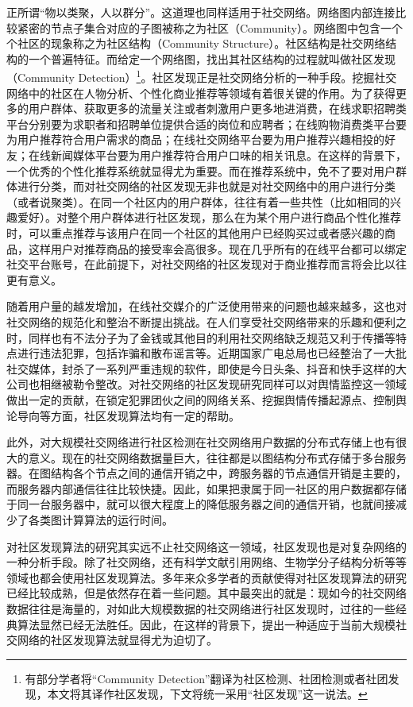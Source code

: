 正所谓“物以类聚，人以群分”。这道理也同样适用于社交网络。网络图内部连接比较紧密的节点子集合对应的子图被称之为社区（Community）。网络图中包含一个个社区的现象称之为社区结构（Community Structure）。社区结构是社交网络结构的一个普遍特征。而给定一个网络图，找出其社区结构的过程就叫做社区发现（Community Detection）\footnote{有部分学者将“Community Detection”翻译为社区检测、社团检测或者社团发现，本文将其译作社区发现，下文将统一采用“社区发现”这一说法。}。社区发现正是社交网络分析的一种手段。挖掘社交网络中的社区在人物分析、个性化商业推荐等领域有着很关键的作用。为了获得更多的用户群体、获取更多的流量关注或者刺激用户更多地进消费，在线求职招聘类平台分别要为求职者和招聘单位提供合适的岗位和应聘者；在线购物消费类平台要为用户推荐符合用户需求的商品；在线社交网络平台要为用户推荐兴趣相投的好友；在线新闻媒体平台要为用户推荐符合用户口味的相关讯息。在这样的背景下，一个优秀的个性化推荐系统就显得尤为重要。而在推荐系统中，免不了要对用户群体进行分类，而对社交网络的社区发现无非也就是对社交网络中的用户进行分类（或者说聚类）。在同一个社区内的用户群体，往往有着一些共性（比如相同的兴趣爱好）。对整个用户群体进行社区发现，那么在为某个用户进行商品个性化推荐时，可以重点推荐与该用户在同一个社区的其他用户已经购买过或者感兴趣的商品，这样用户对推荐商品的接受率会高很多。现在几乎所有的在线平台都可以绑定社交平台账号，在此前提下，对社交网络的社区发现对于商业推荐而言将会比以往更有意义。

随着用户量的越发增加，在线社交媒介的广泛使用带来的问题也越来越多，这也对社交网络的规范化和整治不断提出挑战。在人们享受社交网络带来的乐趣和便利之时，同样也有不法分子为了金钱或其他目的利用社交网络缺乏规范又利于传播等特点进行违法犯罪，包括诈骗和散布谣言等。近期国家广电总局也已经整治了一大批社交媒体，封杀了一系列严重违规的软件，即使是今日头条、抖音和快手这样的大公司也相继被勒令整改。对社交网络的社区发现研究同样可以对舆情监控这一领域做出一定的贡献，在锁定犯罪团伙之间的网络关系、挖掘舆情传播起源点、控制舆论导向等方面，社区发现算法均有一定的帮助。

此外，对大规模社交网络进行社区检测在社交网络用户数据的分布式存储上也有很大的意义。现在的社交网络数据量巨大，往往都是以图结构分布式存储于多台服务器。在图结构各个节点之间的通信开销之中，跨服务器的节点通信开销是主要的，而服务器内部通信往往比较快捷。因此，如果把隶属于同一社区的用户数据都存储于同一台服务器中，就可以很大程度上的降低服务器之间的通信开销，也就间接减少了各类图计算算法的运行时间。

对社区发现算法的研究其实远不止社交网络这一领域，社区发现也是对复杂网络的一种分析手段。除了社交网络，还有科学文献引用网络、生物学分子结构分析等等领域也都会使用社区发现算法。多年来众多学者的贡献使得对社区发现算法的研究已经比较成熟，但是依然存在着一些问题。其中最突出的就是：现如今的社交网络数据往往是海量的，对如此大规模数据的社交网络进行社区发现时，过往的一些经典算法显然已经无法胜任。因此，在这样的背景下，提出一种适应于当前大规模社交网络的社区发现算法就显得尤为迫切了。

